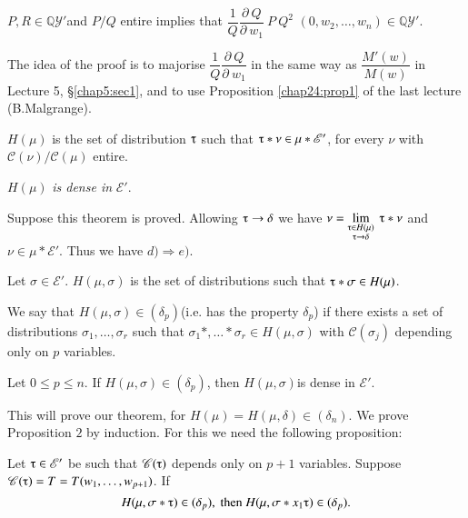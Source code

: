\setcounter{proposition}{0}
\begin{proposition}\label{chap24:prop1}%
  $P,R \in \mathbb{Q}\mathscr{Y}'$\pageoriginale and $P/Q$ entire implies that
  $\dfrac{1}{Q}\dfrac{\partial ~ Q}{\partial ~ w_1} ~ P ~ Q^2 $ $(0,w_2,
  \ldots, w_n) \in \mathbb{Q}\mathscr{Y}'$. 
\end{proposition}

The idea of the proof is to majorise $\dfrac{1}{Q}\dfrac{\partial ~
 Q}{\partial ~ w_1}$ in the same way as $\dfrac{M'(w)}{M(w)}$ in
Lecture 5, \S  \ref{chap5:sec1}, and to use Proposition
\ref{chap24:prop1} of the last lecture (B.Malgrange). 

\begin{defi*}%
 $H(\mu)$ is the set of distribution $\tauup$ such that $\tauup * \nu
 \in \mu * \mathscr{E}'$, for every $\nu$ with $\mathscr{C} (\nu)/
 \mathscr{C}(\mu)$ entire. 
\end{defi*}

\begin{theorem*}
  $H(\mu)$ {\em{is dense in}} $\mathscr{E}'$.
\end{theorem*}

Suppose this theorem is proved. Allowing $\tauup \rightarrow \delta$
we have $\nu = \lim\limits_{\substack{\tauup \in H (\mu) \\ \tauup
 \rightarrow \delta}} ~ \tauup * \nu$ and $\nu \in\mu *
\mathscr{E}'$. Thus we have $d) \Rightarrow e)$. 

\begin{defi*}%
  Let $\sigma \in \mathscr{E}'$. $H(\mu,\sigma)$ is the set of
  distributions such that $\tauup * \sigma \in H(\mu)$. 
\end{defi*}

We say that $H(\mu,\sigma) \in (\delta_p)$(i.e. has the property
$\delta_p$) if there exists a set of distributions $\sigma_1, \ldots,
\sigma_r$ such that $\sigma_{1}*, \ldots * \sigma_r \in H(\mu,\sigma)
$ with $\mathscr{C}(\sigma_j)$ depending only on $p$ variables. 

\begin{proposition}\label{chap24:prop2}%
 Let $0 \le p \le n$. If $H(\mu, \sigma) \in (\delta_p)$, then
 $H(\mu,\sigma)$is dense in $\mathscr{E}'$. 
\end{proposition}

This will prove our theorem, for $H(\mu) = H(\mu,\delta) \in
(\delta_n)$. We prove Proposition $2$ by induction. For this we need
the following proposition: 
\begin{proposition}\label{chap24:prop3}%
 Let $\tauup \in \mathscr{E}'$ be such that $\mathscr{C} (\tauup)$
 depends only on $p + 1$ variables. Suppose $\mathscr{C}(\tauup) = T
 = T(w_1,\ldots, w_{p+1})$. If 
 $$
 H(\mu,\sigma * \tauup) \in (\delta_p), \text{ then } H(\mu,\sigma *
 x_1 \tauup) \in (\delta_p). 
 $$
\end{proposition}


